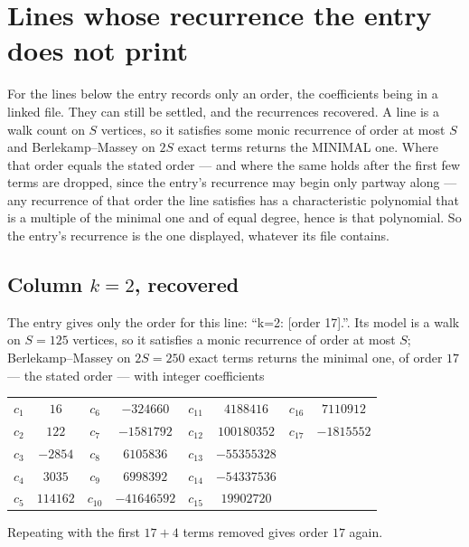 \documentclass[11pt,a4paper]{article}
\theoremstyle{plain}
\theoremstyle{definition}
\begin{document}
\section{Lines whose recurrence the entry does not print}

For the lines below the entry records only an order, the coefficients being in a linked file.
They can still be settled, and the recurrences recovered. A line is a walk count on $S$
vertices, so it satisfies some monic recurrence of order at most $S$ and Berlekamp--Massey on
$2S$ exact terms returns the MINIMAL one. Where that order equals the stated order --- and
where the same holds after the first few terms are dropped, since the entry's recurrence may
begin only partway along --- any recurrence of that order the line satisfies has a
characteristic polynomial that is a multiple of the minimal one and of equal degree, hence is
that polynomial. So the entry's recurrence is the one displayed, whatever its file contains.

\subsection*{Column $k=2$, recovered}
The entry gives only the order for this line: ``k=2: [order 17].''. Its model is a walk on
$S=125$ vertices, so it satisfies a monic recurrence of order at most $S$;
Berlekamp--Massey on $2S=250$ exact terms returns the minimal one, of order
$17$ --- the stated order --- with integer coefficients
\begin{center}\small\begin{tabular}{cccccccc}
$c_{1}$ & $16$ & $c_{6}$ & $-324660$ & $c_{11}$ & $4188416$ & $c_{16}$ & $7110912$ \\
$c_{2}$ & $122$ & $c_{7}$ & $-1581792$ & $c_{12}$ & $100180352$ & $c_{17}$ & $-1815552$ \\
$c_{3}$ & $-2854$ & $c_{8}$ & $6105836$ & $c_{13}$ & $-55355328$ &  &  \\
$c_{4}$ & $3035$ & $c_{9}$ & $6998392$ & $c_{14}$ & $-54337536$ &  &  \\
$c_{5}$ & $114162$ & $c_{10}$ & $-41646592$ & $c_{15}$ & $19902720$ &  &  \\
\end{tabular}\end{center}
Repeating with the first $17+4$ terms removed gives order $17$ again.
\end{document}
